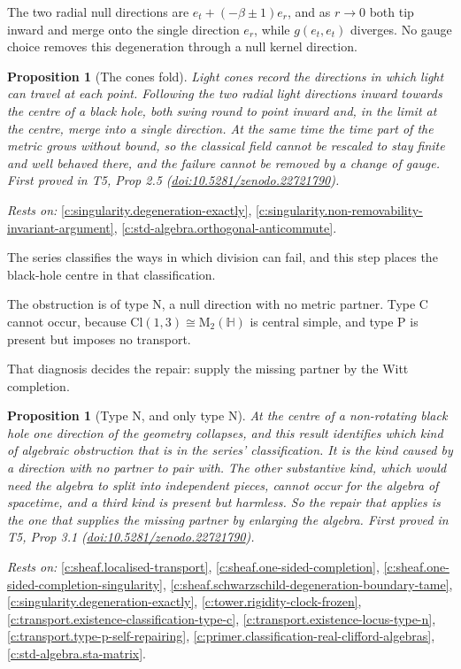 \documentclass[11pt]{article}
\newtheorem{proposition}[theorem]{Proposition}
\theoremstyle{definition}
\theoremstyle{plain}
\providecommand{\Cl}{}\renewcommand{\Cl}{\mathrm{Cl}}
\providecommand{\HH}{}\renewcommand{\HH}{\mathbb{H}}
\providecommand{\Mat}{}\renewcommand{\Mat}{\mathrm{M}}
\providecommand{\er}{}\renewcommand{\er}{e_r}
\providecommand{\et}{}\renewcommand{\et}{e_t}
\begin{document}
The two radial null directions are $\et + (-\beta \pm 1)\er$, and as $r \to 0$ both tip inward and merge onto the single direction $\er$, while $g(\et,\et)$ diverges. No gauge choice removes this degeneration through a null kernel direction.

\begin{proposition}[The cones fold]\label{c:singularity.cones-fold}
Light cones record the directions in which light can travel at each point. Following the two radial light directions inward towards the centre of a black hole, both swing round to point inward and, in the limit at the centre, merge into a single direction. At the same time the time part of the metric grows without bound, so the classical field cannot be rescaled to stay finite and well behaved there, and the failure cannot be removed by a change of gauge.
\emph{First proved in} T5, Prop 2.5 (\href{https://doi.org/10.5281/zenodo.22721790}{doi:10.5281/zenodo.22721790}).
\end{proposition}
\noindent\emph{Rests on:} \ref{c:singularity.degeneration-exactly}, \ref{c:singularity.non-removability-invariant-argument}, \ref{c:std-algebra.orthogonal-anticommute}.

The series classifies the ways in which division can fail, and this step places the black-hole centre in that classification.

The obstruction is of type N, a null direction with no metric partner. Type C cannot occur, because $\Cl(1,3) \cong \Mat_2(\HH)$ is central simple, and type P is present but imposes no transport.

That diagnosis decides the repair: supply the missing partner by the Witt completion.

\begin{proposition}[Type N, and only type N]\label{c:singularity.type-n-only-type-n}
At the centre of a non-rotating black hole one direction of the geometry collapses, and this result identifies which kind of algebraic obstruction that is in the series' classification. It is the kind caused by a direction with no partner to pair with. The other substantive kind, which would need the algebra to split into independent pieces, cannot occur for the algebra of spacetime, and a third kind is present but harmless. So the repair that applies is the one that supplies the missing partner by enlarging the algebra.
\emph{First proved in} T5, Prop 3.1 (\href{https://doi.org/10.5281/zenodo.22721790}{doi:10.5281/zenodo.22721790}).
\end{proposition}
\noindent\emph{Rests on:} \ref{c:sheaf.localised-transport}, \ref{c:sheaf.one-sided-completion}, \ref{c:sheaf.one-sided-completion-singularity}, \ref{c:sheaf.schwarzschild-degeneration-boundary-tame}, \ref{c:singularity.degeneration-exactly}, \ref{c:tower.rigidity-clock-frozen}, \ref{c:transport.existence-classification-type-c}, \ref{c:transport.existence-locus-type-n}, \ref{c:transport.type-p-self-repairing}, \ref{c:primer.classification-real-clifford-algebras}, \ref{c:std-algebra.sta-matrix}.
\end{document}
